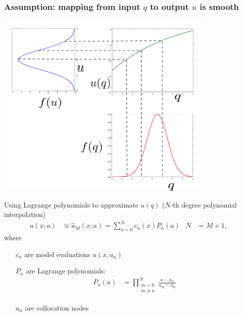 \documentclass{beamer}
\begin{document}
\begin{frame}
  \frametitle{Assumption: mapping from input $q$ to output $u$ is smooth}
  \begin{center}
   \includegraphics[width=0.8\textwidth]{mapping.png}
  \end{center}
\end{frame}

\begin{frame}[fragile]{Using Lagrange polynomials to approximate $u(q)$ ($N$-th degree polynomial interpolation)}{}
    \begin{align*}
        u(x;a) &\approx \hat u_M(x;a) =
        \sum_{n=0}^N c_n(x) P_n(a) & N&=M+1,
    \end{align*}
    where
    \begin{itemize}
        \item[$c_n$] are model evaluations $u(x, a_n)$
        \item[$P_n$] are Lagrange polynomials:
            \begin{align*}
                P_n(a) &= \prod_{\substack{m=0 \\ m\neq n}}^N \frac{a-a_n}{a_m-a_n}
            \end{align*}
        \item[$a_n$] are collocation nodes
    \end{itemize}
\end{frame}
\end{document}
